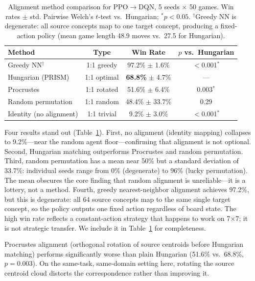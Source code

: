 \documentclass[11pt,a4paper]{article}
\begin{document}
\begin{table}[t]
\centering
\caption{Alignment method comparison for PPO$\to$DQN, 5 seeds $\times$ 50 games. Win rates $\pm$ std. Pairwise Welch's $t$-test vs.\ Hungarian; $^*p < 0.05$. $^\dagger$Greedy NN is degenerate: all source concepts map to one target concept, producing a fixed-action policy (mean game length 48.9 moves vs.\ 27.5 for Hungarian).}
\label{tab:alignment}
\begin{tabular}{lccc}
\toprule
\textbf{Method} & \textbf{Type} & \textbf{Win Rate} & \textbf{$p$ vs.\ Hungarian} \\
\midrule
Greedy NN$^\dagger$      & 1:1 greedy    & 97.2\% $\pm$ 1.6\% & $<$0.001$^*$ \\
Hungarian (PRISM)    & 1:1 optimal   & \textbf{68.8\%} $\pm$ 4.7\% & --- \\
Procrustes           & 1:1 rotated   & 51.6\% $\pm$ 6.4\% & 0.003$^*$ \\
Random permutation   & 1:1 random    & 48.4\% $\pm$ 33.7\% & 0.29 \\
Identity (no alignment) & 1:1 trivial & 9.2\% $\pm$ 3.0\% & $<$0.001$^*$ \\
\bottomrule
\end{tabular}
\end{table}

Four results stand out (Table~\ref{tab:alignment}). First, no alignment (identity mapping) collapses to 9.2\%---near the random agent floor---confirming that alignment is not optional. Second, Hungarian matching outperforms Procrustes and random permutation. Third, random permutation has a mean near 50\% but a standard deviation of 33.7\%: individual seeds range from 0\% (degenerate) to 96\% (lucky permutation). The mean obscures the core finding that random alignment is unreliable---it is a lottery, not a method. Fourth, greedy nearest-neighbor alignment achieves 97.2\%, but this is degenerate: all 64 source concepts map to the same single target concept, so the policy outputs one fixed action regardless of board state. The high win rate reflects a constant-action strategy that happens to work on 7$\times$7; it is not strategic transfer. We include it in Table~\ref{tab:alignment} for completeness.

Procrustes alignment (orthogonal rotation of source centroids before Hungarian matching) performs significantly worse than plain Hungarian (51.6\% vs.\ 68.8\%, $p=0.003$). On the same-task, same-domain setting here, rotating the source centroid cloud distorts the correspondence rather than improving it.
\end{document}
